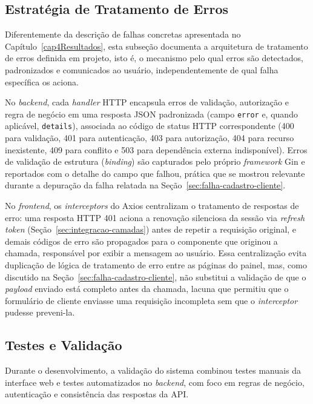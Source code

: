 \subsection{Estratégia de Tratamento de Erros}
\label{sec:estrategia-erros}

Diferentemente da descrição de falhas concretas apresentada no Capítulo~\ref{cap4Resultados}, esta subseção documenta a arquitetura de tratamento de erros definida em projeto, isto é, o mecanismo pelo qual erros são detectados, padronizados e comunicados ao usuário, independentemente de qual falha específica os aciona.

No \textit{backend}, cada \textit{handler} HTTP encapsula erros de validação, autorização e regra de negócio em uma resposta JSON padronizada (campo \texttt{error} e, quando aplicável, \texttt{details}), associada ao código de status HTTP correspondente (400 para validação, 401 para autenticação, 403 para autorização, 404 para recurso inexistente, 409 para conflito e 503 para dependência externa indisponível). Erros de validação de estrutura (\textit{binding}) são capturados pelo próprio \textit{framework} Gin e reportados com o detalhe do campo que falhou, prática que se mostrou relevante durante a depuração da falha relatada na Seção~\ref{sec:falha-cadastro-cliente}.

No \textit{frontend}, os \textit{interceptors} do Axios centralizam o tratamento de respostas de erro: uma resposta HTTP 401 aciona a renovação silenciosa da sessão via \textit{refresh token} (Seção~\ref{sec:integracao-camadas}) antes de repetir a requisição original, e demais códigos de erro são propagados para o componente que originou a chamada, responsável por exibir a mensagem ao usuário. Essa centralização evita duplicação de lógica de tratamento de erro entre as páginas do painel, mas, como discutido na Seção~\ref{sec:falha-cadastro-cliente}, não substitui a validação de que o \textit{payload} enviado está completo antes da chamada, lacuna que permitiu que o formulário de cliente enviasse uma requisição incompleta sem que o \textit{interceptor} pudesse preveni-la.

\subsection{Testes e Validação}
\label{sec:testes-e-validacao-cap3}

Durante o desenvolvimento, a validação do sistema combinou testes manuais da interface web e testes automatizados no \textit{backend}, com foco em regras de negócio, autenticação e consistência das respostas da API.

